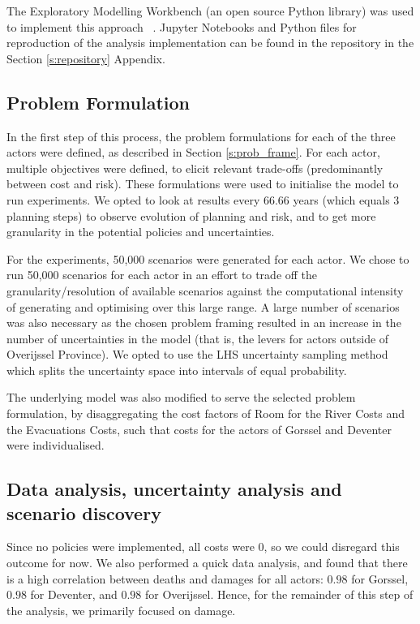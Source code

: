 The Exploratory Modelling Workbench (an open source Python library) was used to implement this approach ~\parencite{kwakkel_exploratory_2017}. Jupyter Notebooks and Python files for reproduction of the analysis implementation can be found in the repository in the Section \ref{s:repository} Appendix.

\subsection{Problem Formulation}
In the first step of this process, the problem formulations for each of the three actors were defined, as described in Section \ref{s:prob_frame}. For each actor, multiple objectives were defined, to elicit relevant trade-offs (predominantly between cost and risk). These formulations were used to initialise the model to run experiments. We opted to look at results every $66.66$ years (which equals 3 planning steps) to observe evolution of planning and risk, and to get more granularity in the potential policies and uncertainties.

For the experiments, 50,000 scenarios were generated for each actor. We chose to run 50,000 scenarios for each actor in an effort to trade off the granularity/resolution of available scenarios against the computational intensity of generating and optimising over this large range. A large number of scenarios was also necessary as the chosen problem framing resulted in an increase in the number of uncertainties in the model (that is, the levers for actors outside of Overijssel Province). We opted to use the LHS uncertainty sampling method which splits the uncertainty space into intervals of equal probability.

The underlying model was also modified to serve the selected problem formulation, by disaggregating the cost factors of Room for the River Costs and the Evacuations Costs, such that costs for the actors of Gorssel and Deventer were individualised.

\subsection{Data analysis, uncertainty analysis and scenario discovery}
Since no policies were implemented, all costs were 0, so we could disregard this outcome for now. We also performed a quick data analysis, and found that there is a high correlation between deaths and damages for all actors: $0.98$ for Gorssel, $0.98$ for Deventer, and $0.98$ for Overijssel. Hence, for the remainder of this step of the analysis, we primarily focused on damage.

